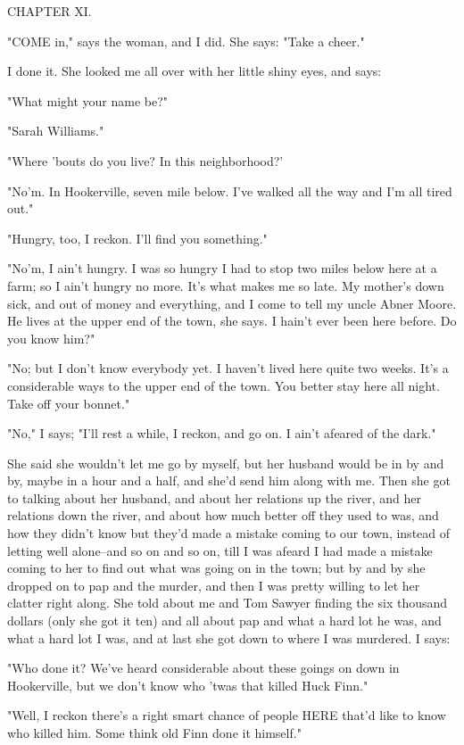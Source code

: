 CHAPTER XI.

"COME in," says the woman, and I did.  She says:  "Take a cheer."

I done it.  She looked me all over with her little shiny eyes, and says:

"What might your name be?"

"Sarah Williams."

"Where 'bouts do you live?  In this neighborhood?'

"No'm.  In Hookerville, seven mile below.  I've walked all the way and
I'm all tired out."

"Hungry, too, I reckon.  I'll find you something."

"No'm, I ain't hungry.  I was so hungry I had to stop two miles below
here at a farm; so I ain't hungry no more.  It's what makes me so late.
My mother's down sick, and out of money and everything, and I come to
tell my uncle Abner Moore.  He lives at the upper end of the town, she
says.  I hain't ever been here before.  Do you know him?"

"No; but I don't know everybody yet.  I haven't lived here quite two
weeks. It's a considerable ways to the upper end of the town.  You better
stay here all night.  Take off your bonnet."

"No," I says; "I'll rest a while, I reckon, and go on.  I ain't afeared
of the dark."

She said she wouldn't let me go by myself, but her husband would be in by
and by, maybe in a hour and a half, and she'd send him along with me.
Then she got to talking about her husband, and about her relations up the
river, and her relations down the river, and about how much better off
they used to was, and how they didn't know but they'd made a mistake
coming to our town, instead of letting well alone--and so on and so on,
till I was afeard I had made a mistake coming to her to find out what was
going on in the town; but by and by she dropped on to pap and the murder,
and then I was pretty willing to let her clatter right along.  She told
about me and Tom Sawyer finding the six thousand dollars (only she got it
ten) and all about pap and what a hard lot he was, and what a hard lot I
was, and at last she got down to where I was murdered.  I says:

"Who done it?  We've heard considerable about these goings on down in
Hookerville, but we don't know who 'twas that killed Huck Finn."

"Well, I reckon there's a right smart chance of people HERE that'd like
to know who killed him.  Some think old Finn done it himself."

